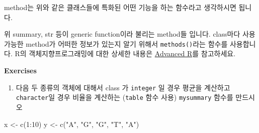 \documentclass[
  a4paper,
]{book}
\newenvironment{Shaded}{\begin{snugshade}}{\end{snugshade}}
\newcommand{\AttributeTok}[1]{\textcolor[rgb]{0.40,0.45,0.13}{#1}}
\newcommand{\DecValTok}[1]{\textcolor[rgb]{0.68,0.00,0.00}{#1}}
\newcommand{\FunctionTok}[1]{\textcolor[rgb]{0.28,0.35,0.67}{#1}}
\newcommand{\NormalTok}[1]{\textcolor[rgb]{0.00,0.23,0.31}{#1}}
\newcommand{\OtherTok}[1]{\textcolor[rgb]{0.00,0.23,0.31}{#1}}
\newcommand{\SpecialCharTok}[1]{\textcolor[rgb]{0.37,0.37,0.37}{#1}}
\newcommand{\StringTok}[1]{\textcolor[rgb]{0.13,0.47,0.30}{#1}}
\providecommand{\tightlist}{%
  \setlength{\itemsep}{0pt}\setlength{\parskip}{0pt}}\usepackage{longtable,booktabs,array}
\begin{document}
method는 위와 같은 클래스들에 특화된 어떤 기능을 하는 함수라고
생각하시면 됩니다.

\begin{Shaded}
\end{Shaded}

위 summary, str 등이 generic function이라 불리는 method들 입니다.
class마다 사용 가능한 method가 어떠한 정보가 있는지 알기 위해서
\texttt{methods()}라는 함수를 사용합니다. R의 객체지향프로그래밍에 대한
상세한 내용은 \href{https://adv-r.hadley.nz/s3.html}{Advanced R}를
참고하세요.

\textbf{Exercises}

\begin{enumerate}
\def\labelenumi{\arabic{enumi})}
\tightlist
\item
  다음 두 종류의 객체에 대해서 class 가 \texttt{integer} 일 경우 평균을
  계산하고 \texttt{character}일 경우 비율을 계산하는 (\texttt{table}
  함수 사용) \texttt{mysummary} 함수를 만드시오
\end{enumerate}

\begin{Shaded}
\begin{Highlighting}[]
\NormalTok{x }\OtherTok{\textless{}{-}} \FunctionTok{c}\NormalTok{(}\DecValTok{1}\SpecialCharTok{:}\DecValTok{10}\NormalTok{)}
\NormalTok{y }\OtherTok{\textless{}{-}} \FunctionTok{c}\NormalTok{(}\StringTok{"A"}\NormalTok{, }\StringTok{"G"}\NormalTok{, }\StringTok{"G"}\NormalTok{, }\StringTok{"T"}\NormalTok{, }\StringTok{"A"}\NormalTok{)}
\end{Highlighting}
\end{Shaded}
\end{document}

